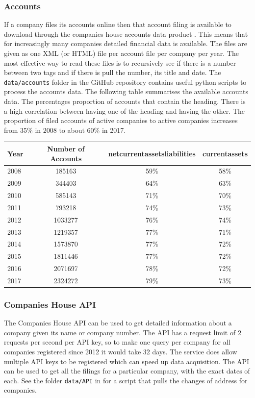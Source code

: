 \documentclass[a4paper,10pt]{article}
\begin{document}
   \subsubsection{Accounts}
   If a company files its accounts online then that account filing is available to download through the companies house accounts data product \cite{accountsdataproduct}. This means that for increasingly many companies detailed financial data is available.
   The files are given as one XML (or HTML) file per account file per company per year. The most effective way to read these files is to recursively see if there is a number between two tags and if there is pull the number, its title and date. The \texttt{data/accounts} folder in the GitHub repository \cite{github} contains useful python scripts to process the accounts data. The following table summarises the available accounts data. The percentages proportion of accounts that contain the heading. There is a high correlation between having one of the heading and having the other. The proportion of filed accounts of active companies to active companies increases from 35\% in 2008 to about 60\% in 2017.
   \begin{center}
      \begin{tabular}{  l | c | c | c  }
      Year & Number of Accounts & netcurrentassetsliabilities & currentassets \\
      \hline
      2008 & 185163  & 59\% & 58\% \\
      2009 & 344403  & 64\% & 63\% \\
      2010 & 585143  & 71\% & 70\% \\
      2011 & 793218  & 74\% & 73\% \\
      2012 & 1033277 & 76\% & 74\% \\
      2013 & 1219357 & 77\% & 71\% \\
      2014 & 1573870 & 77\% & 72\% \\
      2015 & 1811446 & 77\% & 72\% \\
      2016 & 2071697 & 78\% & 72\% \\
      2017 & 2324272 & 79\% & 73\% \\

      \end{tabular}
   \end{center}


   \subsubsection{Companies House API}
   The Companies House API \cite{companieshouseapi} can be used to get detailed information about a company given its name or company number. The API has a request limit of 2 requests per second per API key, so to make one query per company for all companies registered since 2012 it would take 32 days. The service does allow multiple API keys to be registered which can speed up data acquisition. The API can be used to get all the filings for a particular company, with the exact dates of each. See the folder \texttt{data/API} in \cite{github} for a script that pulls the changes of address for companies.
\end{document}

